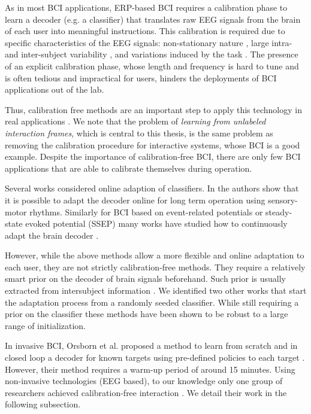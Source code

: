 As in most BCI applications, ERP-based BCI requires a calibration phase to learn a decoder (e.g. a classifier) that translates raw EEG signals from the brain of each user into meaningful instructions. This calibration is required due to specific characteristics of the EEG signals: non-stationary nature \cite{vidaurre11}, large intra- and inter-subject variability \cite{Polich1997}, and variations induced by the task \cite{iturrate2013task}. The presence of an explicit calibration phase, whose length and frequency is hard to tune and is often tedious and impractical for users, hinders the deployments of BCI applications out of the lab. 

Thus, calibration free methods are an important step to apply this technology in real applications \cite{millan10}. We note that the problem of \emph{learning from unlabeled interaction frames}, which is central to this thesis, is the same problem as removing the calibration procedure for interactive systems, whose BCI is a good example. Despite the importance of calibration-free BCI, there are only few BCI applications that are able to calibrate themselves during operation.

Several works considered online adaption of classifiers. In \cite{vidaurre2010towards} the authors show that it is possible to adapt the decoder online for long term operation using sensory-motor rhythms. Similarly for BCI based on
event-related potentials or steady-state evoked potential (SSEP) many works have studied how to continuously adapt the brain decoder \cite{fazli2009subject,lu2009unsupervised,fazli2011l1,congedo2013new,schettini2014self}.

However, while the above methods allow a more flexible and online adaptation to each user, they are not strictly calibration-free methods. They require a relatively smart prior on the decoder of brain signals beforehand. Such prior is usually extracted from intersubject information \cite{fazli2009subject,lu2009unsupervised,vidaurre2010towards}. We identified two other works that start the adaptation process from a randomly seeded classifier. While still requiring a prior on the classifier these methods have been shown to be robust to a large range of initialization.

In invasive BCI, Orsborn et al. proposed a method to learn from scratch and in closed loop a decoder for known targets using pre-defined policies to each target \cite{Orsborn2012}. However, their method requires a warm-up period of around 15 minutes. Using non-invasive technologies (EEG based), to our knowledge only one group of researchers achieved calibration-free interaction \cite{Kindermans2012a,kindermans2014true}. We detail their work in the following subsection.

